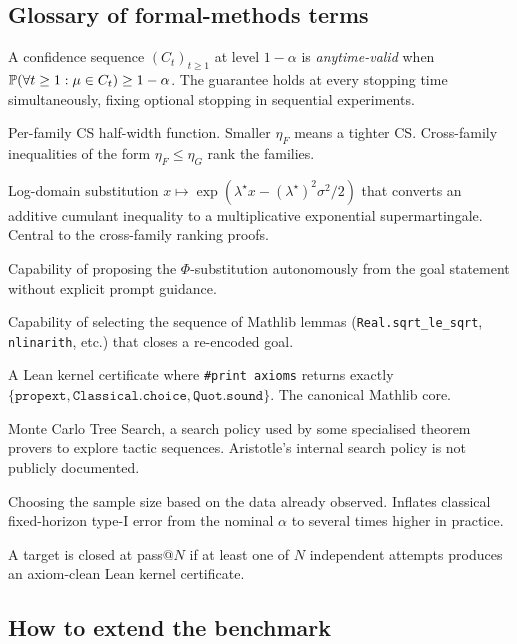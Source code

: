 \subsection{Glossary of formal-methods terms}
\label{app:glossary}

\begin{description}[leftmargin=1.3em, itemsep=0.2em]
\item[Anytime-valid CS.] A confidence sequence
$(C_t)_{t\geq 1}$ at level $1-\alpha$ is \emph{anytime-valid} when
$\mathbb{P}(\forall t \geq 1 : \mu \in C_t) \geq 1-\alpha$. The
guarantee holds at every stopping time simultaneously, fixing
optional stopping in sequential experiments.
\item[Rate function $\eta_F$.] Per-family CS half-width
function. Smaller $\eta_F$ means a tighter CS. Cross-family
inequalities of the form $\eta_F \leq \eta_G$ rank the families.
\item[$\Phi$-substitution.] Log-domain substitution
$x \mapsto \exp(\lambda^\star x - (\lambda^\star)^2 \sigma^2 / 2)$
that converts an additive cumulant inequality to a multiplicative
exponential supermartingale. Central to the cross-family ranking
proofs.
\item[Lateral re-encoding.] Capability of proposing the
$\Phi$-substitution autonomously from the goal statement without
explicit prompt guidance.
\item[Tactic vocabulary.] Capability of selecting the
sequence of Mathlib lemmas (\texttt{Real.sqrt\_le\_sqrt},
\texttt{nlinarith}, etc.) that closes a re-encoded goal.
\item[Axiom-clean closure.] A Lean kernel certificate where
\texttt{\#print axioms} returns exactly
$\{\texttt{propext}, \texttt{Classical.choice}, \texttt{Quot.sound}\}$.
The canonical Mathlib core.
\item[MCTS.] Monte Carlo Tree Search, a search policy used by
some specialised theorem provers to explore tactic sequences.
Aristotle's internal search policy is not publicly documented.
\item[Optional stopping.] Choosing the sample size based on
the data already observed. Inflates classical fixed-horizon
type-I error from the nominal $\alpha$ to several times higher
in practice.
\item[pass@$N$.] A target is closed at pass@$N$ if at least one
of $N$ independent attempts produces an axiom-clean Lean kernel
certificate.
\end{description}

\subsection{How to extend the benchmark}
\label{app:how-to-extend}

